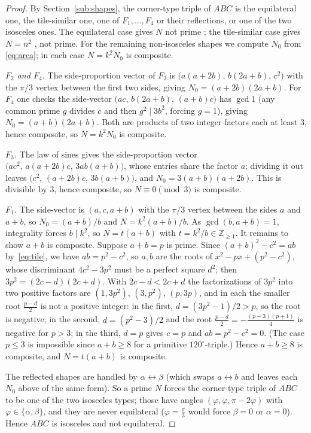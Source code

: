 \documentclass[11pt,reqno]{amsart}
\theoremstyle{plain}
\theoremstyle{definition}
\newcommand{\Z}{\mathbb{Z}}
\begin{document}
\begin{proof}
By Section~\ref{sub:shapes}, the corner-type triple of $ABC$ is the equilateral one, the
tile-similar one, one of $F_1,\dots,F_4$ or their reflections, or one of the two isosceles ones.
The equilateral case gives $N$ not prime \cite[Thm.~6]{BeesonEq}; the tile-similar case gives
$N=n^2$ \cite{BeesonI, SWW}, not prime. For the remaining non-isosceles shapes we compute $N_0$
from \eqref{eq:area}; in each case $N=k^2N_0$ is composite.

\emph{$F_2$ and $F_4$.} The side-proportion vector of $F_2$ is
$\bigl(a(a+2b),\,b(2a+b),\,c^2\bigr)$ with the $\pi/3$ vertex between the first two sides, giving
$N_0=(a+2b)(2a+b)$. For $F_4$ one checks the side-vector $\bigl(ac,\,b(2a+b),\,(a+b)c\bigr)$ has
$\gcd 1$ (any common prime $g$ divides $c$ and then $g^2\mid 3b^2$, forcing $g=1$), giving
$N_0=(a+b)(2a+b)$. Both are products of two integer factors each at least $3$, hence composite, so
$N=k^2N_0$ is composite.

\emph{$F_3$.} The law of sines gives the side-proportion vector
$\bigl(ac^2,\,a(a+2b)c,\,3ab(a+b)\bigr)$, whose entries share the factor $a$; dividing it out leaves
$\bigl(c^2,\,(a+2b)c,\,3b(a+b)\bigr)$, and $N_0=3(a+b)(a+2b)$. This is divisible by $3$, hence
composite, so $N\equiv0\pmod3$ is composite.

\emph{$F_1$.} The side-vector is $(a,c,a+b)$ with the $\pi/3$ vertex between the sides $a$ and
$a+b$, so $N_0=(a+b)/b$ and $N=k^2(a+b)/b$. As $\gcd(b,a+b)=1$, integrality forces $b\mid k^2$, so
$N=t(a+b)$ with $t=k^2/b\in\Z_{\ge1}$. It remains to show $a+b$ is composite. Suppose $a+b=p$ is
prime. Since $(a+b)^2-c^2=ab$ by~\eqref{eq:tile}, we have $ab=p^2-c^2$, so $a,b$ are the roots of
$x^2-px+(p^2-c^2)$, whose discriminant $4c^2-3p^2$ must be a perfect square $d^2$; then
$3p^2=(2c-d)(2c+d)$. With $2c-d<2c+d$ the factorizations of $3p^2$ into two positive factors are
$(1,3p^2)$, $(3,p^2)$, $(p,3p)$, and in each the smaller root $\tfrac{p-d}{2}$ is not a positive
integer: in the first, $d=(3p^2-1)/2>p$, so the root is negative; in the second, $d=(p^2-3)/2$ and
the root $\tfrac{p-d}{2}=-\tfrac{(p-3)(p+1)}{4}$ is negative for $p>3$; in the third, $d=p$ gives
$c=p$ and $ab=p^2-c^2=0$. (The case $p\le3$ is impossible since $a+b\ge8$ for a primitive
$120^\circ$-triple.) Hence $a+b\ge8$ is composite, and $N=t(a+b)$ is composite.

The reflected shapes are handled by $\alpha\leftrightarrow\beta$ (which swaps $a\leftrightarrow b$
and leaves each $N_0$ above of the same form). So a prime $N$ forces the corner-type triple of
$ABC$ to be one of the two isosceles types; those have angles $(\varphi,\varphi,\pi-2\varphi)$ with
$\varphi\in\{\alpha,\beta\}$, and they are never equilateral ($\varphi=\frac\pi3$ would force
$\beta=0$ or $\alpha=0$). Hence $ABC$ is isosceles and not equilateral.
\end{proof}
\end{document}
